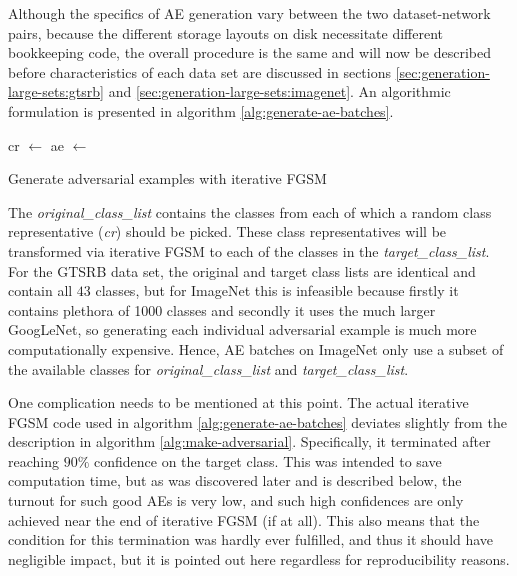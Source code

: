 \documentclass[11pt, a4paper]{article}
\begin{document}
Although the specifics of AE generation vary between the two dataset-network pairs, because the different storage layouts on disk necessitate different bookkeeping code, the overall procedure is the same and will now be described before characteristics of each data set are discussed in sections \ref{sec:generation-large-sets:gtsrb} and \ref{sec:generation-large-sets:imagenet}. An algorithmic formulation is presented in algorithm \ref{alg:generate-ae-batches}.

\begin{algorithm}
	\begin{algorithmic}
				\State cr $\gets$ 
					\State ae $\gets$  
				\EndFor
			\EndFor
	\end{algorithmic}
	\caption{Generate adversarial examples with iterative FGSM}
	\label{alg:generate-ae-batches}
\end{algorithm}

The \emph{original\_class\_list} contains the classes from each of which a random class representative (\emph{cr}) should be picked. These class representatives will be transformed via iterative FGSM to each of the classes in the \emph{target\_class\_list}. For the GTSRB data set, the original and target class lists are identical and contain all $43$ classes, but for ImageNet this is infeasible because firstly it contains plethora of 1000 classes and secondly it uses the much larger GoogLeNet, so generating each individual adversarial example is much more computationally expensive. Hence, AE batches on ImageNet only use a subset of the available classes for \emph{original\_class\_list} and \emph{target\_class\_list}.

One complication needs to be mentioned at this point. The actual iterative FGSM code used in algorithm \ref{alg:generate-ae-batches} deviates slightly from the description in algorithm \ref{alg:make-adversarial}. Specifically, it terminated after reaching $90\%$ confidence on the target class. This was intended to save computation time, but as was discovered later and is described below, the turnout for such good AEs is very low, and such high confidences are only achieved near the end of iterative FGSM (if at all). This also means that the condition for this termination was hardly ever fulfilled, and thus it should have negligible impact, but it is pointed out here regardless for reproducibility reasons.
\end{document}
